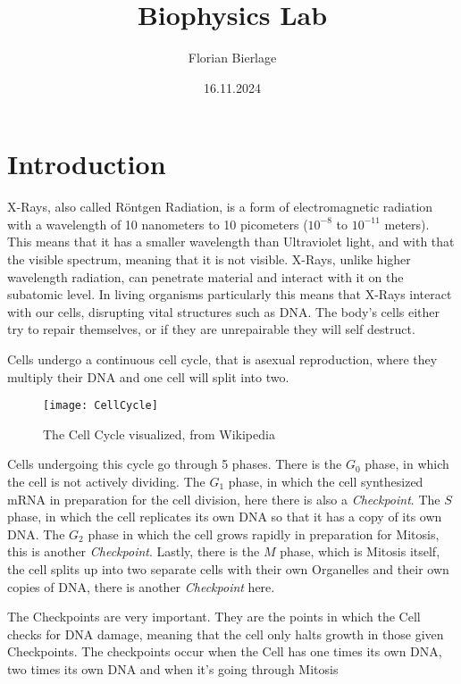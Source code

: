 \documentclass[]{scrartcl}
\title{Biophysics Lab}
\author{Florian Bierlage}
\date{16.11.2024}
\begin{document}
\maketitle
\newpage
\tableofcontents
\newpage

\section{Introduction}

X-Rays, also called Röntgen Radiation, is a form of electromagnetic radiation with a wavelength of 10 nanometers to 10 picometers ($10^{-8}$ to $10^{-11}$ meters). This means that it has a smaller wavelength than Ultraviolet light, and with that the visible spectrum, meaning that it is not visible. X-Rays, unlike higher wavelength radiation, can penetrate material and interact with it on the subatomic level. In living organisms particularly this means that X-Rays interact with our cells, disrupting vital structures such as DNA. The body's cells either try to repair themselves, or if they are unrepairable they will self destruct. 

Cells undergo a continuous cell cycle, that is asexual reproduction, where they multiply their DNA and one cell will split into two.

\begin{center}
	\begin{figure}[h!]
	\texttt{[image: CellCycle]}
	\caption{The Cell Cycle visualized, from Wikipedia}
	\end{figure}
\end{center}
Cells undergoing this cycle go through 5 phases. There is the $G_0$ phase, in which the cell is not actively dividing. The $G_1$ phase, in which the cell synthesized mRNA in preparation for the cell division, here there is also a \textit{Checkpoint}. The $S$ phase, in which the cell replicates its own DNA so that it has a copy of its own DNA. The $G_2$ phase in which the cell grows rapidly in preparation for Mitosis, this is another \textit{Checkpoint}. Lastly, there is the $M$ phase, which is Mitosis itself, the cell splits up into two separate cells with their own Organelles and their own copies of DNA, there is another \textit{Checkpoint} here.

The Checkpoints are very important. They are the points in which the Cell checks for DNA damage, meaning that the cell only halts growth in those given Checkpoints. The checkpoints occur when the Cell has one times its own DNA, two times its own DNA and when it's going through Mitosis
\end{document}

